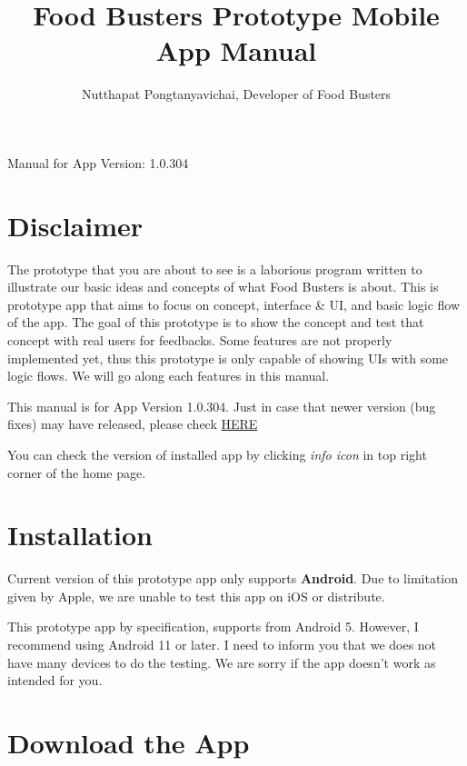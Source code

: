 \documentclass[a4paper,12pt]{article}
\begin{document}
\title{\textbf{Food Busters Prototype Mobile App Manual}}
\author{Nutthapat Pongtanyavichai, Developer of Food Busters}

\maketitle
\centerline{\LARGE{Manual for App Version: 1.0.304}}

\tableofcontents

\pagebreak
\section{Disclaimer}

The prototype that you are about to see is a laborious program written to
illustrate our basic ideas and concepts of what Food Busters is about.
This is prototype app that aims to focus on concept, interface \& UI,
and basic logic flow of the app. The goal of this prototype is to show the concept
and test that concept with real users for feedbacks. Some features are not properly implemented yet, thus this prototype is only capable of showing UIs with some logic flows.
We will go along each features in this manual.

This manual is for App Version 1.0.304. Just in case that newer version (bug fixes) may
have released, please check \href{https://github.com/Food-Busters/food_busters/releases}{HERE}

You can check the version of installed app by clicking \textit{info icon}
in top right corner of the home page.

\section{Installation}

Current version of this prototype app only supports \textbf{Android}. Due to
limitation given by Apple, we are unable to test this app on iOS or distribute.

This prototype app by specification, supports from Android 5.
However, I recommend using Android 11 or later.
I need to inform you that we does not have many devices to do the testing.
We are sorry if the app doesn't work as intended for you.

\section*{Download the App}
\end{document}

